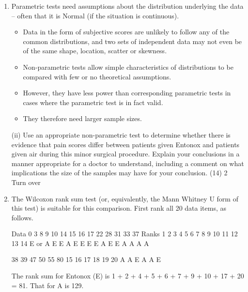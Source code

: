 \documentclass[a4paper,12pt]{article}
\begin{document}
\begin{enumerate} 
\item Parametric tests need assumptions about the distribution underlying the data  –  often that it is Normal (if the situation is continuous).  
\begin{itemize}
    \item Data in the form of subjective scores are unlikely to follow any of the common distributions, and two sets of independent data may not even be of the same shape, location, scatter or skewness. 
    \item Non-parametric tests allow simple characteristics of distributions to be compared with few or no theoretical assumptions.  
    \item However, they have less power than corresponding parametric tests in cases where the parametric test is in fact valid.  
    \item They therefore need larger sample sizes. 
\end{itemize}

\newpage
\begin{framed}
 (ii) Use an appropriate non-parametric test to determine whether there is evidence that pain scores differ between patients given Entonox and patients given air during this minor surgical procedure.  Explain your conclusions in a manner appropriate for a doctor to understand, including a comment on what implications the size of the samples may have for your conclusion. (14) 
2 
Turn over 
\end{framed}
 
\item  The Wilcoxon rank sum test (or, equivalently, the Mann Whitney U form of this test) is suitable for this comparison.  First rank all 20 data items, as follows. 
 
Data 0 3 8 9 10 14 15 16 17 22 28 31 33 37 Ranks 1 2 3 4 5 6 7 8 9 10 11 12 13 14 E or A E E A E E E E A E E A A A A 
 
38 39 47 50 55 80 15 16 17 18 19 20 A A E A A E 
 
 
The rank sum for Entonox (E) is 1 + 2 + 4 + 5 + 6 + 7 + 9 + 10 + 17 + 20 = 81.  That for A is 129. 
 

\end{enumerate}
\end{document}
